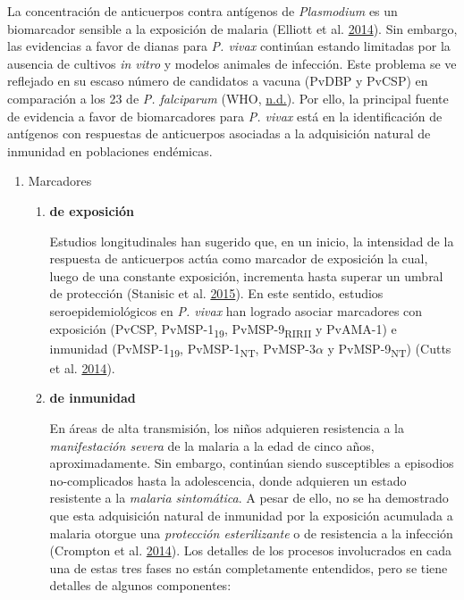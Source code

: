 \documentclass[
  a4paper]{article}
\begin{document}
La concentración de anticuerpos contra antígenos de \emph{Plasmodium} es
un biomarcador sensible a la exposición de malaria (Elliott et al.
\protect\hyperlink{ref-elliott2014}{2014}). Sin embargo, las evidencias
a favor de dianas para \emph{P. vivax} continúan estando limitadas por
la ausencia de cultivos \emph{in vitro} y modelos animales de infección.
Este problema se ve reflejado en su escaso número de candidatos a vacuna
(PvDBP y PvCSP) en comparación a los 23 de \emph{P. falciparum} (WHO,
\protect\hyperlink{ref-rainbow2016}{n.d.}). Por ello, la principal
fuente de evidencia a favor de biomarcadores para \emph{P. vivax} está
en la identificación de antígenos con respuestas de anticuerpos
asociadas a la adquisición natural de inmunidad en poblaciones
endémicas.

\begin{enumerate}
\def\labelenumi{\alph{enumi}.}
\item
  Marcadores

  \begin{enumerate}
  \def\labelenumii{\roman{enumii}.}
  \item
    \textbf{de exposición}

    Estudios longitudinales han sugerido que, en un inicio, la
    intensidad de la respuesta de anticuerpos actúa como marcador de
    exposición la cual, luego de una constante exposición, incrementa
    hasta superar un umbral de protección (Stanisic et al.
    \protect\hyperlink{ref-Stanisic2015}{2015}). En este sentido,
    estudios seroepidemiológicos en \emph{P. vivax} han logrado asociar
    marcadores con exposición (PvCSP, PvMSP-1\textsubscript{19},
    PvMSP-9\textsubscript{RIRII} y PvAMA-1) e inmunidad
    (PvMSP-1\textsubscript{19}, PvMSP-1\textsubscript{NT},
    PvMSP-3\(\alpha\) y PvMSP-9\textsubscript{NT}) (Cutts et al.
    \protect\hyperlink{ref-cutts2014meta}{2014}). 
  \item
    \textbf{de inmunidad}

    En áreas de alta transmisión, los niños adquieren resistencia a la
    \emph{manifestación severa} de la malaria a la edad de cinco años,
    aproximadamente. Sin embargo, continúan siendo susceptibles a
    episodios no-complicados hasta la adolescencia, donde adquieren un
    estado resistente a la \emph{malaria sintomática}. A pesar de ello,
    no se ha demostrado que esta adquisición natural de inmunidad por la
    exposición acumulada a malaria otorgue una \emph{protección
    esterilizante} o de resistencia a la infección (Crompton et al.
    \protect\hyperlink{ref-crompton2014rev}{2014}). Los detalles de los
    procesos involucrados en cada una de estas tres fases no están
    completamente entendidos, pero se tiene detalles de algunos
    componentes:


\end{enumerate}
\end{enumerate}
\end{document}
